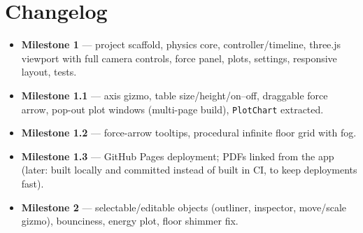 \documentclass[11pt]{article}
\begin{document}
\section*{Changelog}
\begin{itemize}
  \item \textbf{Milestone 1} --- project scaffold, physics core, controller/timeline, three.js
        viewport with full camera controls, force panel, plots, settings, responsive layout, tests.
  \item \textbf{Milestone 1.1} --- axis gizmo, table size/height/on--off, draggable force arrow,
        pop-out plot windows (multi-page build), \texttt{PlotChart} extracted.
  \item \textbf{Milestone 1.2} --- force-arrow tooltips, procedural infinite floor grid with fog.
  \item \textbf{Milestone 1.3} --- GitHub Pages deployment; PDFs linked from the app (later: built locally
        and committed instead of built in CI, to keep deployments fast).
  \item \textbf{Milestone 2} --- selectable/editable objects (outliner, inspector, move/scale gizmo), bounciness,
        energy plot, floor shimmer fix.
\end{itemize}

\printbibliography
\end{document}

